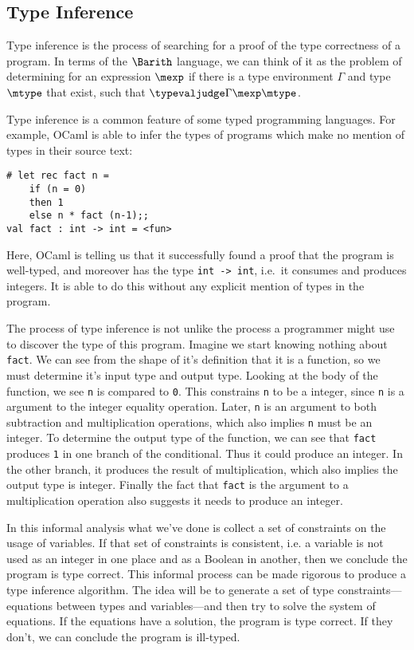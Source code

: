 \subsection{Type Inference}


Type inference is the process of searching for a proof of the type
correctness of a program.  In terms of the $\Barith$ language, we can
think of it as the problem of determining for an expression $\mexp$ if
there is a type environment $\Gamma$ and type $\mtype$ that exist,
such that $\typevaljudge\Gamma\mexp\mtype$.

Type inference is a common feature of some typed programming
languages.  For example, OCaml is able to infer the types of programs
which make no mention of types in their source text:
\begin{verbatim}
# let rec fact n =
    if (n = 0)
    then 1
    else n * fact (n-1);;
val fact : int -> int = <fun>
\end{verbatim}
Here, OCaml is telling us that it successfully found a proof that the
program is well-typed, and moreover has the type {\tt int -> int},
i.e.~it consumes and produces integers.  It is able to do this without
any explicit mention of types in the program.

The process of type inference is not unlike the process a programmer
might use to discover the type of this program.  Imagine we start
knowing nothing about {\tt fact}.  We can see from the shape of it's
definition that it is a function, so we must determine it's input type
and output type.  Looking at the body of the function, we see {\tt n}
is compared to {\tt 0}.  This constrains {\tt n} to be a integer,
since {\tt n} is a argument to the integer equality operation.  Later,
{\tt n} is an argument to both subtraction and multiplication
operations, which also implies {\tt n} must be an integer.  To
determine the output type of the function, we can see that {\tt fact}
produces {\tt 1} in one branch of the conditional.  Thus it could
produce an integer.  In the other branch, it produces the result of
multiplication, which also implies the output type is integer.
Finally the fact that {\tt fact} is the argument to a multiplication
operation also suggests it needs to produce an integer.

In this informal analysis what we've done is collect a set of
constraints on the usage of variables.  If that set of constraints is
consistent, i.e. a variable is not used as an integer in one place and
as a Boolean in another, then we conclude the program is type correct.
This informal process can be made rigorous to produce a type inference
algorithm.  The idea will be to generate a set of type
constraints---equations between types and variables---and then try to
solve the system of equations.  If the equations have a solution, the
program is type correct.  If they don't, we can conclude the program
is ill-typed.


